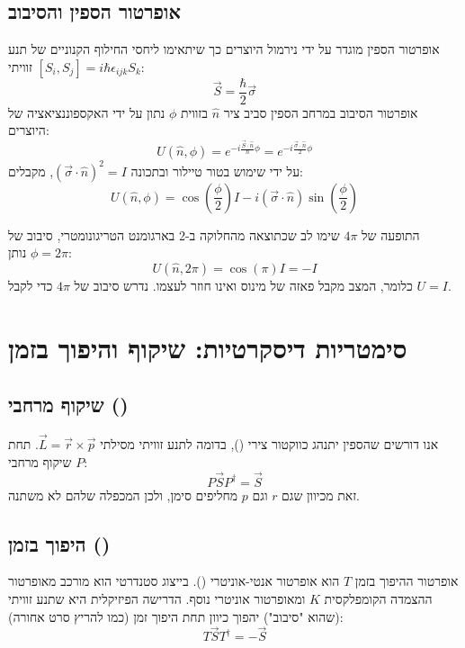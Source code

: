 \subsection{אופרטור הספין והסיבוב}
אופרטור הספין מוגדר על ידי נירמול היוצרים כך שיתאימו ליחסי החילוף הקנוניים של תנע זוויתי $[S_i, S_j] = i\hbar\epsilon_{ijk}S_k$:
$$
\vec{S} = \frac{\hbar}{2}\vec{\sigma}
$$
אופרטור הסיבוב במרחב הספין סביב ציר $\hat{n}$ בזווית $\phi$ נתון על ידי האקספוננציאציה של היוצרים:
$$
U(\hat{n}, \phi) = e^{-i \frac{\vec{S} \cdot \hat{n}}{\hbar} \phi} = e^{-i \frac{\vec{\sigma} \cdot \hat{n}}{2} \phi}
$$
על ידי שימוש בטור טיילור ובתכונה $(\vec{\sigma}\cdot\hat{n})^2 = I$, מקבלים:
\begin{equation}
U(\hat{n}, \phi) = \cos\left(\frac{\phi}{2}\right)I - i(\vec{\sigma} \cdot \hat{n})\sin\left(\frac{\phi}{2}\right)
\end{equation}

\begin{notebox}{התופעה של $4\pi$}
שימו לב שכתוצאה מהחלוקה ב-2 בארגומנט הטריגונומטרי, סיבוב של $\phi = 2\pi$ נותן:
$$ U(\hat{n}, 2\pi) = \cos(\pi)I = -I $$
כלומר, המצב מקבל פאזה של מינוס ואינו חוזר לעצמו. נדרש סיבוב של $4\pi$ כדי לקבל $U=I$.
\end{notebox}

\section{סימטריות דיסקרטיות: שיקוף והיפוך בזמן}

\subsection{שיקוף מרחבי ()}
אנו דורשים שהספין יתנהג כווקטור צירי (), בדומה לתנע זוויתי מסילתי $\vec{L} = \vec{r} \times \vec{p}$.
תחת שיקוף מרחבי $P$:
$$ P\vec{S}P^\dagger = \vec{S} $$
זאת מכיוון שגם $r$ וגם $p$ מחליפים סימן, ולכן המכפלה שלהם לא משתנה.

\subsection{היפוך בזמן ()}
אופרטור ההיפוך בזמן $T$ הוא אופרטור אנטי-אוניטרי (). בייצוג סטנדרטי הוא מורכב מאופרטור ההצמדה הקומפלקסית $K$ ומאופרטור אוניטרי נוסף.
הדרישה הפיזיקלית היא שתנע זוויתי (שהוא "סיבוב") יהפוך כיוון תחת היפוך זמן (כמו להריץ סרט אחורה):
$$ T\vec{S}T^\dagger = -\vec{S} $$

